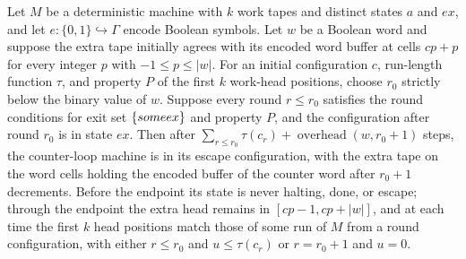 \begin{theorem}
\label{Turing.counterLoopTMVia_escape_witness}
\leanok
{}
Let $M$ be a deterministic machine with $k$ work tapes and distinct states $a$ and $ex$,
and let $e:\{0,1\}\hookrightarrow\Gamma$ encode Boolean symbols. Let $w$ be a
Boolean word and suppose the extra tape initially agrees with its encoded word buffer at
cells $cp+p$ for every integer $p$ with $-1\le p\le |w|$. For an initial configuration
$c$, run-length function $\tau$, and property $P$ of the first $k$ work-head positions,
choose $r_0$ strictly below the binary value of $w$. Suppose every round $r\le r_0$
satisfies the round conditions for exit set $\{some\\ ex\}$ and property $P$, and the
configuration after round $r_0$ is in state $ex$. Then after $\sum_{r\le
r_0}\tau(c_r)+\operatorname{overhead}(w,r_0+1)$ steps, the counter-loop machine is in
its escape configuration, with the extra tape on the word cells holding the encoded
buffer of the counter word after $r_0+1$ decrements. Before the endpoint its state is
never halting, done, or escape; through the endpoint the extra head remains in
$[cp-1,cp+|w|]$, and at each time the first $k$ head positions match those of some run
of $M$ from a round configuration, with either $r\le r_0$ and $u\le\tau(c_r)$ or
$r=r_0+1$ and $u=0$.
\end{theorem}

